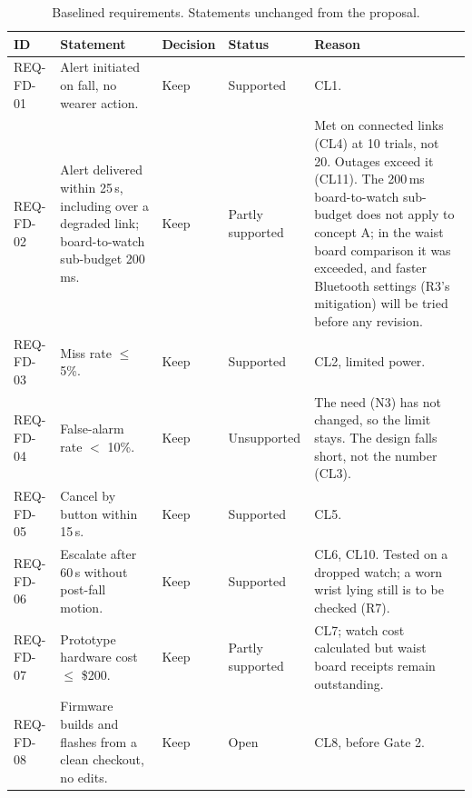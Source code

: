 
\begin{table}[!tb]
\centering
\scriptsize
\renewcommand{\arraystretch}{1.15}
\setlength{\tabcolsep}{3pt}
\caption{Baselined requirements. Statements unchanged from the proposal.}
\label{tab:baseline}
\begin{tabularx}{\linewidth}{@{}L{0.075} L{0.27} L{0.07} L{0.11} Y@{}}
\toprule
ID & Statement & Decision & Status & Reason \\
\midrule
REQ-FD-01 & Alert initiated on fall, no wearer action. & Keep & Supported & CL1. \\
REQ-FD-02 & Alert delivered within 25\,s, including over a degraded link; board-to-watch sub-budget 200\,ms. & Keep & Partly supported & Met on connected links (CL4) at 10 trials, not 20. Outages exceed it (CL11). The 200\,ms board-to-watch sub-budget does not apply to concept A; in the waist board comparison it was exceeded, and faster Bluetooth settings (R3's mitigation) will be tried before any revision. \\
REQ-FD-03 & Miss rate $\leq$ 5\%. & Keep & Supported & CL2, limited power. \\
REQ-FD-04 & False-alarm rate $<$ 10\%. & Keep & Unsupported & The need (N3) has not changed, so the limit stays. The design falls short, not the number (CL3). \\
REQ-FD-05 & Cancel by button within 15\,s. & Keep & Supported & CL5. \\
REQ-FD-06 & Escalate after 60\,s without post-fall motion. & Keep & Supported & CL6, CL10. Tested on a dropped watch; a worn wrist lying still is to be checked (R7). \\
REQ-FD-07 & Prototype hardware cost $\leq$ \$200. & Keep & Partly supported & CL7; watch cost calculated but waist board receipts remain outstanding. \\
REQ-FD-08 & Firmware builds and flashes from a clean checkout, no edits. & Keep & Open & CL8, before Gate 2. \\
\bottomrule
\end{tabularx}
\end{table}
